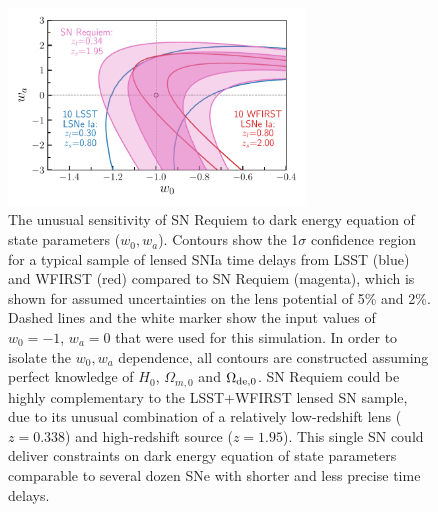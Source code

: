 \documentclass[fleqn,10pt]{wlscirep}
\begin{document}
\begin{figure}
    \centering
    \includegraphics[width=0.7\textwidth]{../Figures/snrequiem_w0wa_compared_to_lsst_wfirst.pdf}
    \caption{The unusual sensitivity of SN Requiem to dark energy equation of state parameters ($w_0, w_a$). Contours show the 1$\sigma$ confidence region for a typical sample of lensed SNIa time delays from LSST (blue) and WFIRST (red) compared to SN Requiem (magenta), which is shown for assumed uncertainties on the lens potential of 5\% and 2\%. Dashed lines and the white marker show the input values of $w_0=-1$, $w_a=0$ that were used for this simulation. In order to isolate the $w_0, w_a$ dependence, all contours are constructed assuming perfect knowledge of $H_0$, $\Omega_{m,0}$ and $\Omega_{\rm de,0}$.  SN Requiem could be highly complementary to the LSST+WFIRST lensed SN sample, due to its unusual combination of a relatively low-redshift lens ($z=0.338$) and high-redshift source ($z=1.95$). This single SN could deliver constraints on dark energy equation of state parameters comparable to several dozen SNe with shorter and less precise  time delays.}
    \label{fig:my_label}
\end{figure}



\pagebreak
\citep{jha_improved_2007}


\end{document}

